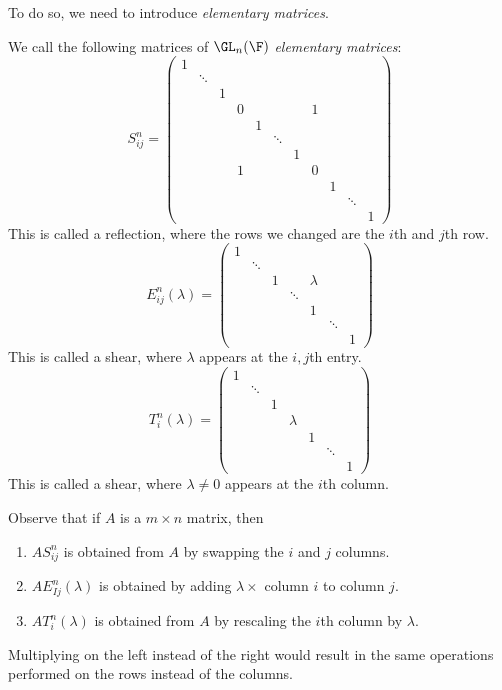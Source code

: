 \documentclass[a4paper]{article}
\begin{document}
To do so, we need to introduce \emph{elementary matrices}.
\begin{defi}
  We call the following matrices of $\GL_n(\F)$ \emph{elementary matrices}:
  \setcounter{MaxMatrixCols}{11}
  \[
    S_{ij}^n =
    \begin{pmatrix}
      1\\
      & \ddots\\
      & & 1\\
      & & & 0 & & & & 1\\
      & & & & 1\\
      & & & & & \ddots\\
      & & & & & & 1\\
      & & & 1 & & & & 0\\
      & & & & & & & & 1\\
      & & & & & & & & & \ddots\\
      & & & & & & & & & & 1
    \end{pmatrix}
  \]
This is called a reflection, where the rows we changed are the $i$th and $j$th row.
  \[
    E_{ij}^n (\lambda) =
    \begin{pmatrix}
      1 \\
      & \ddots \\
      & & 1 & & \lambda\\
      & & & \ddots\\
      & & & & 1\\
      & & & & & \ddots\\
      & & & & & & 1
    \end{pmatrix}
  \]
  This is called a shear, where $\lambda$ appears at the $i,j$th entry.
  \[
    T_{i}^n (\lambda) =
    \begin{pmatrix}
      1 \\
      & \ddots\\
      & & 1 \\
      & & & \lambda\\
      & & & & 1\\
      & & & & & \ddots\\
      & & & & & & 1
    \end{pmatrix}
  \]
  This is called a shear, where $\lambda\not= 0$ appears at the $i$th column. %
\end{defi}
Observe that if $A$ is a $m\times n$ matrix, then
\begin{enumerate}
  \item $AS_{ij}^n$ is obtained from $A$ by swapping the $i$ and $j$ columns.
  \item $AE_{Ij}^n(\lambda)$ is obtained by adding $\lambda\times$ column $i$ to column $j$.
  \item $AT_i^n (\lambda)$ is obtained from $A$ by rescaling the $i$th column by $\lambda$.
\end{enumerate}
Multiplying on the left instead of the right would result in the same operations performed on the rows instead of the columns.
\end{document}
